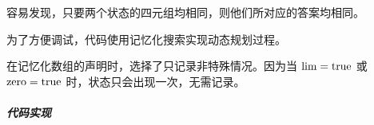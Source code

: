 容易发现，只要两个状态的四元组均相同，则他们所对应的答案均相同。

为了方便调试，代码使用记忆化搜索实现动态规划过程。

在记忆化数组的声明时，选择了只记录非特殊情况。因为当 \(\rm lim=true\) 或
\(\rm zero=true\) 时，状态只会出现一次，无需记录。

\subparagraph{代码实现}

\begin{Shaded}
\begin{Highlighting}[]
 \OperatorTok{;}
 \OperatorTok{=} \OperatorTok{;}
\OperatorTok{,}\OperatorTok{,}\OperatorTok{[}\OperatorTok{];}
\OperatorTok{[}\OperatorTok{][}\OperatorTok{];}
\OperatorTok{(}\OperatorTok{,} \OperatorTok{,} \OperatorTok{,} \OperatorTok{)} \OperatorTok{\{}
    \OperatorTok{(}\OperatorTok{==} \OperatorTok{)}  \OperatorTok{;}
    \OperatorTok{(!}\OperatorTok{\&\&} \OperatorTok{!}\OperatorTok{\&\&}\OperatorTok{[}\OperatorTok{][}\OperatorTok{]} \OperatorTok{!=} \OperatorTok{{-}}\OperatorTok{)} \OperatorTok{[}\OperatorTok{][}\OperatorTok{];}
    \OperatorTok{=} \OperatorTok{;}
    \OperatorTok{=}\OperatorTok{[}\OperatorTok{]} \OperatorTok{:} \OperatorTok{;}
    \OperatorTok{(}\OperatorTok{=} \OperatorTok{;}\OperatorTok{\textless{}=}\OperatorTok{;}\OperatorTok{++)} \OperatorTok{(}\OperatorTok{(}\OperatorTok{{-}}\OperatorTok{)} \OperatorTok{\textgreater{}=} \OperatorTok{)}
\OperatorTok{+=}\OperatorTok{(}\OperatorTok{{-}} \OperatorTok{,} \OperatorTok{(}\OperatorTok{\&} \OperatorTok{(}\OperatorTok{==} \OperatorTok{))}  \OperatorTok{{-}} \OperatorTok{:}\OperatorTok{,}

\end{Highlighting}
\end{Shaded}

